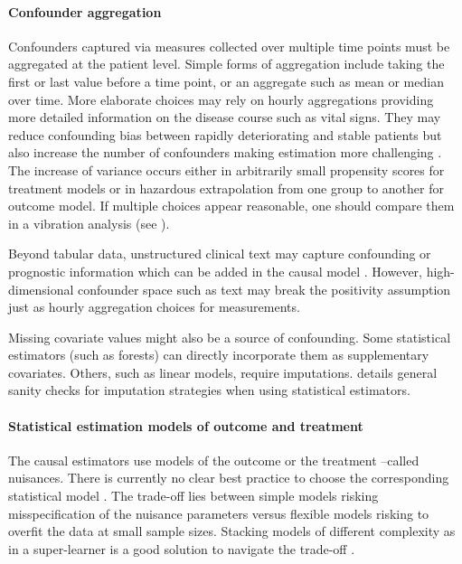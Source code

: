 \documentclass[10pt,letterpaper]{article}
\providecommand{\DIFaddtex}[1]{{\protect\color{blue}\uwave{#1}}} %
\providecommand{\DIFaddbegin}{} %
\providecommand{\DIFaddend}{} %
\providecommand{\DIFdelbegin}{} %
\providecommand{\DIFdelend}{} %
\providecommand{\DIFadd}[1]{\texorpdfstring{\DIFaddtex{#1}}{#1}} %
\newcommand{\DIFscaledelfig}{0.5}
\newlength{\DIFdelgraphicswidth} %
\newlength{\DIFdelgraphicsheight} %
\newcommand{\DIFaddincludegraphics}[2][]{{\color{blue}\fbox{\DIFOincludegraphics[#1]{#2}}}} %
\newcommand{\DIFdelincludegraphics}[2][]{%
\sbox{\DIFdelgraphicsbox}{\DIFOincludegraphics[#1]{#2}}%
\settoboxwidth{\DIFdelgraphicswidth}{\DIFdelgraphicsbox} %
\settoboxtotalheight{\DIFdelgraphicsheight}{\DIFdelgraphicsbox} %
\scalebox{\DIFscaledelfig}{%
\parbox[b]{\DIFdelgraphicswidth}{\usebox{\DIFdelgraphicsbox}\\[-\baselineskip] \rule{\DIFdelgraphicswidth}{0em}}\llap{\resizebox{\DIFdelgraphicswidth}{\DIFdelgraphicsheight}{%
\setlength{\unitlength}{\DIFdelgraphicswidth}%
\begin{picture}(1,1)%
\thicklines\linethickness{2pt} %
{\color[rgb]{1,0,0}\put(0,0){\framebox(1,1){}}}%
{\color[rgb]{1,0,0}\put(0,0){\line( 1,1){1}}}%
{\color[rgb]{1,0,0}\put(0,1){\line(1,-1){1}}}%
\end{picture}%
}\hspace*{3pt}}} %
} %
\DeclareRobustCommand{\DIFaddbegin}{\DIFOaddbegin \let\includegraphics\DIFaddincludegraphics} %
\DeclareRobustCommand{\DIFaddend}{\DIFOaddend \let\includegraphics\DIFOincludegraphics} %
\DeclareRobustCommand{\DIFdelbegin}{\DIFOdelbegin \let\includegraphics\DIFdelincludegraphics} %
\DeclareRobustCommand{\DIFdelend}{\DIFOaddend \let\includegraphics\DIFOincludegraphics} %
\begin{document}
\paragraph{Confounder aggregation}
Confounders captured via measures collected over multiple time points must be
aggregated at the patient level. Simple forms of aggregation include taking the
first or last value before a time point, or an aggregate such as mean or median
over time. More elaborate choices may rely on hourly aggregations providing more
detailed information on the disease course such as vital signs. They may reduce
confounding bias between rapidly deteriorating and stable patients but also
increase the number of confounders making estimation more challenging
\cite{damour2020overlap}. The increase of variance occurs either in
arbitrarily small propensity scores for treatment models or in hazardous
extrapolation from one group to another for outcome model. If multiple
choices appear reasonable, one should compare them in a vibration analysis
(see ).

Beyond tabular data, unstructured clinical text may capture confounding or
prognostic information \cite{horng2017creating,jiang2023health} which can be
added in the causal model \cite{zeng2022uncovering}.
However, high-dimensional
confounder space such as text may break the positivity assumption just as hourly
aggregation choices for measurements.

Missing covariate values might also be a source of confounding. Some statistical
estimators (such as forests) can directly incorporate them as supplementary
covariates. Others, such as linear models, require imputations.
\DIFdelbegin %
\DIFdelend \DIFaddbegin \DIFadd{S3 Appendix }\DIFaddend details general sanity checks for
imputation strategies when using statistical estimators.

\paragraph{Statistical estimation models of outcome and treatment}

The causal estimators use models of the outcome or the treatment --called
nuisances. There is currently no clear best practice to choose the corresponding
statistical model \cite{wendling2018comparing, dorie2019automated}. The
trade-off lies between simple models risking misspecification of the nuisance
parameters versus flexible models risking to overfit the data at small sample
sizes. Stacking models of different complexity as in a super-learner is a good
solution to navigate the trade-off \cite{van2007super,doutreligne2023select}.
\end{document}

